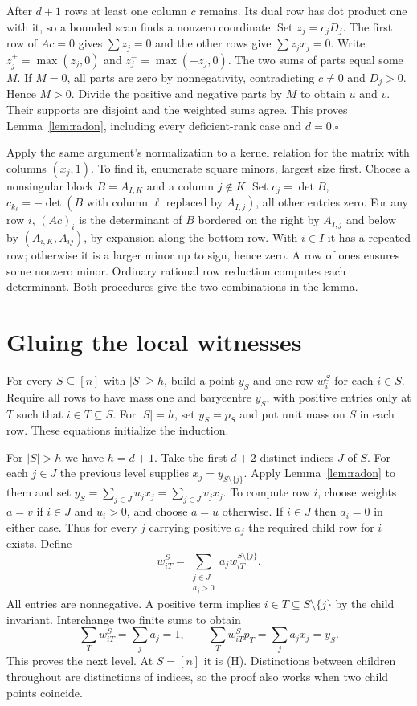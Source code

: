 \documentclass[11pt,letterpaper]{article}
\newcommand{\key}[1]{\smallskip\noindent{\sffamily\bfseries\color{ink}#1}\enspace}
\theoremstyle{packet}\newtheorem{theorem}{Theorem}\newtheorem{lem}[theorem]{Lemma}
\newcommand{\head}[1]{\section{#1}}
\begin{document}
After $d+1$ rows at least one column $c$ remains. Its dual row has dot product one with it, so a bounded scan finds a nonzero coordinate. Set $z_j=c_j D_j$. The first row of $Ac=0$ gives $\sum z_j=0$ and the other rows give $\sum z_jx_j=0$. Write $z_j^+=\max(z_j,0)$ and $z_j^-=\max(-z_j,0)$. The two sums of parts equal some $M$. If $M=0$, all parts are zero by nonnegativity, contradicting $c\ne0$ and $D_j>0$. Hence $M>0$. Divide the positive and negative parts by $M$ to obtain $u$ and $v$. Their supports are disjoint and the weighted sums agree. This proves Lemma~\ref{lem:radon}, including every deficient-rank case and $d=0$.\hfill$\square$

\key{The independent minor construction in Python.} Apply the same argument's normalization to a kernel relation for the matrix with columns $(x_j,1)$. To find it, enumerate square minors, largest size first. Choose a nonsingular block $B=A_{I,K}$ and a column $j\notin K$. Set $c_j=\det B$, $c_{k_\ell}=-\det(B\text{ with column }\ell\text{ replaced by }A_{I,j})$, all other entries zero. For any row $i$, $(Ac)_i$ is the determinant of $B$ bordered on the right by $A_{I,j}$ and below by $(A_{i,K},A_{ij})$, by expansion along the bottom row. With $i\in I$ it has a repeated row; otherwise it is a larger minor up to sign, hence zero. A row of ones ensures some nonzero minor. Ordinary rational row reduction computes each determinant. Both procedures give the two combinations in the lemma.

\newpage
\head{Gluing the local witnesses}\label{sec:glue}

For every $S\subseteq[n]$ with $|S|\ge h$, build a point $y_S$ and one row $w^S_i$ for each $i\in S$. Require all rows to have mass one and barycentre $y_S$, with positive entries only at $T$ such that $i\in T\subseteq S$. For $|S|=h$, set $y_S=p_S$ and put unit mass on $S$ in each row. These equations initialize the induction.

For $|S|>h$ we have $h=d+1$. Take the first $d+2$ distinct indices $J$ of $S$. For each $j\in J$ the previous level supplies $x_j=y_{S\setminus\{j\}}$. Apply Lemma~\ref{lem:radon} to them and set $y_S=\sum_{j\in J}u_jx_j=\sum_{j\in J}v_jx_j$. To compute row $i$, choose weights $a=v$ if $i\in J$ and $u_i>0$, and choose $a=u$ otherwise. If $i\in J$ then $a_i=0$ in either case. Thus for every $j$ carrying positive $a_j$ the required child row for $i$ exists. Define
\[
 w^S_{iT}=\sum_{\substack{j\in J\\ a_j>0}} a_j w^{S\setminus\{j\}}_{iT}.
\]
All entries are nonnegative. A positive term implies $i\in T\subseteq S\setminus\{j\}$ by the child invariant. Interchange two finite sums to obtain
\[
 \sum_T w^S_{iT}=\sum_j a_j=1,\qquad
 \sum_T w^S_{iT}p_T=\sum_j a_j x_j=y_S .
\]
This proves the next level. At $S=[n]$ it is (H). Distinctions between children throughout are distinctions of indices, so the proof also works when two child points coincide.
\end{document}
